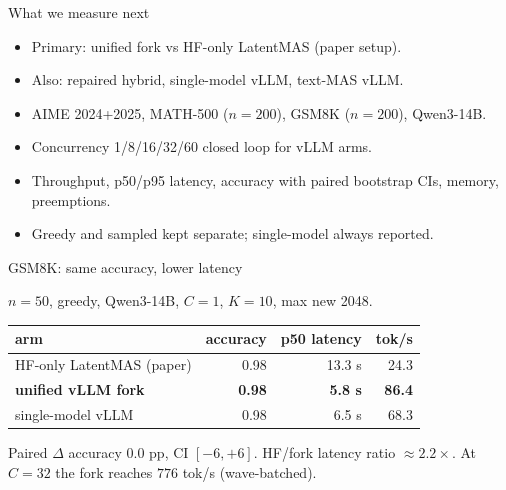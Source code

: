\documentclass[aspectratio=169]{beamer}
\begin{document}
\begin{frame}{What we measure next}

\begin{itemize}
  \item Primary: unified fork vs HF-only LatentMAS (paper setup).
  \item Also: repaired hybrid, single-model vLLM, text-MAS vLLM.
  \item AIME 2024{+}2025, MATH-500 ($n{=}200$), GSM8K ($n{=}200$), Qwen3-14B.
  \item Concurrency 1/8/16/32/60 closed loop for vLLM arms.
  \item Throughput, p50/p95 latency, accuracy with paired bootstrap CIs, memory, preemptions.
  \item Greedy and sampled kept separate; single-model always reported.
\end{itemize}

\end{frame}

\begin{frame}{GSM8K: same accuracy, lower latency}

$n{=}50$, greedy, Qwen3-14B, $C{=}1$, $K{=}10$, max new 2048.

\begin{center}
\begin{tabular}{lrrr}
\toprule
arm & accuracy & p50 latency & tok/s \\
\midrule
HF-only LatentMAS (paper) & 0.98 & 13.3 s & 24.3 \\
\textbf{unified vLLM fork} & \textbf{0.98} & \textbf{5.8 s} & \textbf{86.4} \\
single-model vLLM & 0.98 & 6.5 s & 68.3 \\
\bottomrule
\end{tabular}
\end{center}

\vspace{0.5em}
Paired $\Delta$ accuracy $0.0$ pp, CI $[-6,+6]$. HF/fork latency ratio $\approx 2.2\times$.
At $C{=}32$ the fork reaches $776$ tok/s (wave-batched).

\end{frame}
\end{document}
